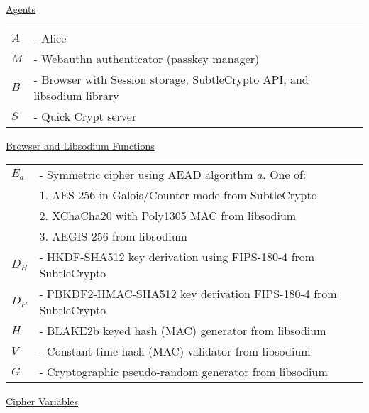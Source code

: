 \documentclass{article}
\begin{document}
\underline{Agents}\\

\begin{tabular}{@{}p{2mm} l}
$A$ & \textrm{ - Alice} \\
$M$ & \textrm{ - Webauthn authenticator (passkey manager)} \\
$B$ & \textrm{ - Browser with Session storage, SubtleCrypto API, and libsodium library} \\
$S$ & \textrm{ - Quick Crypt server} \\
\end{tabular}

\hfill \break


\underline{Browser and Libsodium Functions}\\

\begin{tabular}{@{}p{2mm} l}
$E_a$ & \textrm{ - Symmetric cipher using AEAD algorithm }$a$\textrm{. One of:}\\
& \hspace{23pt}\textrm{1. AES-256 in Galois/Counter mode from SubtleCrypto} \\
& \hspace{23pt}\textrm{2. XChaCha20 with Poly1305 MAC from libsodium} \\
& \hspace{23pt}\textrm{3. AEGIS 256 from libsodium} \\
$D_H$ & \textrm{ - HKDF-SHA512 key derivation using FIPS-180-4 from SubtleCrypto} \\
$D_P$ & \textrm{ - PBKDF2-HMAC-SHA512 key derivation FIPS-180-4 from SubtleCrypto} \\
$H$ & \textrm{ - BLAKE2b keyed hash (MAC) generator from libsodium} \\
$V$ & \textrm{ - Constant-time hash (MAC) validator from libsodium} \\
$G$ & \textrm{ - Cryptographic pseudo-random generator from libsodium} \\
\end{tabular}

\hfill \break

\underline{Cipher Variables}\\
\end{document}
